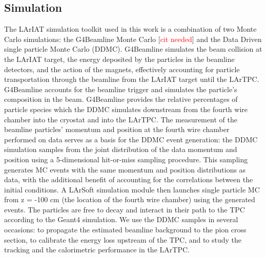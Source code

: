 \documentclass[aps,prl,twocolumn,showpacs,superscriptaddress,groupedaddress]{revtex4}  %
\begin{document}
\subsection{\label{sec:Simulation}Simulation}
The LArIAT simulation toolkit used in this work is a combination of two Monte Carlo simulations: the G4Beamline Monte Carlo  [\textcolor{red}{cit needed}] and the Data Driven single particle Monte Carlo (DDMC).  G4Beamline simulates the beam collision at the LArIAT target, the energy deposited by the particles in the beamline detectors, and the action of the magnets, effectively accounting for particle transportation through the beamline from the LArIAT target until the LArTPC. G4Beamline accounts for the beamline trigger and simulates the particle's composition in the beam. G4Beamline provides the relative percentages of particle species which the DDMC simulates downstream from the fourth wire chamber into the cryostat and into the LArTPC.  The measurement of the beamline particles' momentum and position at the fourth wire chamber performed on data serves as a basis for the DDMC event generation: the DDMC simulation samples from the joint distribution of the data momentum and position using a 5-dimensional hit-or-miss sampling procedure. This sampling generates MC events  with the same momentum and position distributions as data, with the additional benefit of accounting for the correlations between the initial conditions. A LArSoft simulation module then launches single particle MC from z = -100 cm (the location of the fourth wire chamber) using the generated events. The particles are free to decay and interact in their path to the TPC according to the Geant4 simulation. We use the DDMC samples in several occasions: to propagate the estimated beamline background to the pion cross section, to calibrate the energy loss upstream of the TPC,  and to study the tracking and the calorimetric performance  in the LArTPC. 
\end{document}
